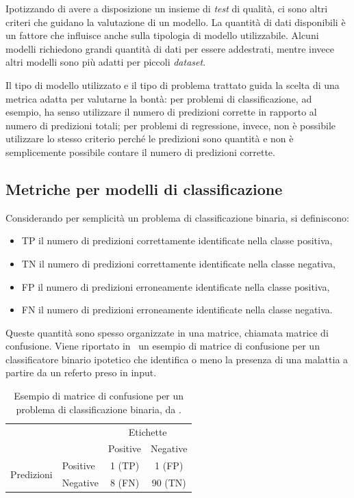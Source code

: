 Ipotizzando di avere a disposizione un insieme di \emph{test} di qualità, ci sono altri criteri che guidano la valutazione di un modello.
La quantità di dati disponibili è un fattore che influisce anche sulla tipologia di modello utilizzabile.
Alcuni modelli richiedono grandi quantità di dati per essere addestrati, mentre invece altri modelli sono più adatti per piccoli \emph{dataset}. 

Il tipo di modello utilizzato e il tipo di problema trattato guida la scelta di una metrica adatta per valutarne la bontà: per problemi di classificazione, ad esempio, ha senso utilizzare il numero di predizioni corrette in rapporto al numero di predizioni totali; per problemi di regressione, invece, non è possibile utilizzare lo stesso criterio perché le predizioni sono quantità e non è semplicemente possibile contare il numero di predizioni corrette. 

\subsection{Metriche per modelli di classificazione}\label{sec:metriche_valutazione_modelli}
Considerando per semplicità un problema di classificazione binaria, si definiscono:
\begin{itemize}
    \item TP il numero di predizioni correttamente identificate nella classe positiva,
    \item TN il numero di predizioni correttamente identificate nella classe negativa,
    \item FP il numero di predizioni erroneamente identificate nella classe positiva,
    \item FN il numero di predizioni erroneamente identificate nella classe negativa.
\end{itemize}
Queste quantità sono spesso organizzate in una matrice, chiamata matrice di confusione.
Viene riportato in~ un esempio di matrice di confusione per un classificatore binario ipotetico che identifica o meno la presenza di una malattia a partire da un referto preso in input.
\begin{table}[h]
    \centering
    \begin{tabular}{l|l|c|c|}
        \multicolumn{2}{c}{}&\multicolumn{2}{c}{Etichette}\\
        \cline{3-4}
        \multicolumn{2}{c|}{} & Positive & Negative\\
        \cline{2-4}
        \multirow{2}{*}{Predizioni}& Positive & 1 (TP) & 1 (FP) \\
        \cline{2-4}
        & Negative & 8 (FN) & 90 (TN) \\
        \cline{2-4}
    \end{tabular}
    \caption{Esempio di matrice di confusione per un problema di classificazione binaria, da \protect\footnotemark.}
    \label{tab:matrice_confusione}
\end{table}

